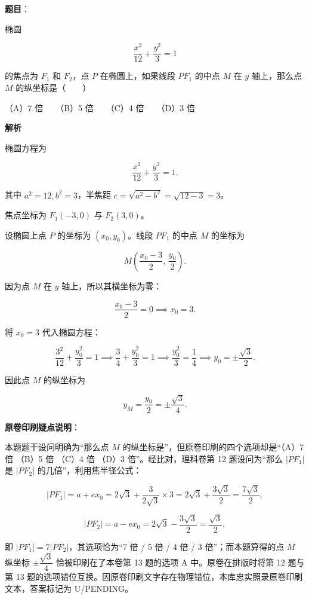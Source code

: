 \begin{answer}

\textbf{题目}：

椭圆

\nopagebreak[4]
\[
\frac{x^2}{12}+\frac{y^2}{3}=1
\]

的焦点为 $F_1$ 和 $F_2$，点 $P$ 在椭圆上，如果线段 $PF_1$ 的中点 $M$ 在 $y$ 轴上，那么点 $M$ 的纵坐标是\mbox{（　　）}

（A）7 倍　　（B）5 倍　　（C）4 倍　　（D）3 倍

\textbf{解析}

椭圆方程为

\nopagebreak[4]
\[
\frac{x^2}{12} + \frac{y^2}{3} = 1.
\]

其中 $a^2=12, b^2=3$，半焦距 $c = \sqrt{a^2-b^2} = \sqrt{12-3} = 3$。

焦点坐标为 $F_1(-3,0)$ 与 $F_2(3,0)$。

设椭圆上点 $P$ 的坐标为 $(x_0, y_0)$。线段 $PF_1$ 的中点 $M$ 的坐标为

\nopagebreak[4]
\[
M\left(\frac{x_0-3}{2},\, \frac{y_0}{2}\right).
\]

因为点 $M$ 在 $y$ 轴上，所以其横坐标为零：

\nopagebreak[4]
\[
\frac{x_0-3}{2} = 0 \implies x_0 = 3.
\]

将 $x_0=3$ 代入椭圆方程：

\nopagebreak[4]
\[
\frac{3^2}{12} + \frac{y_0^2}{3} = 1 \implies \frac34 + \frac{y_0^2}{3} = 1 \implies \frac{y_0^2}{3} = \frac14 \implies y_0 = \pm\frac{\sqrt3}{2}.
\]

因此点 $M$ 的纵坐标为

\nopagebreak[4]
\[
y_M = \frac{y_0}{2} = \pm\frac{\sqrt3}{4}.
\]

\textbf{原卷印刷疑点说明}：

本题题干设问明确为“那么点 $M$ 的纵坐标是”，但原卷印刷的四个选项却是“（A）7 倍 （B）5 倍 （C）4 倍 （D）3 倍”。经比对，理科卷第 12 题设问为“那么 $|PF_1|$ 是 $|PF_2|$ 的几倍”，利用焦半径公式：

\nopagebreak[4]
\[
|PF_1| = a + ex_0 = 2\sqrt3 + \frac{3}{2\sqrt3}\times 3 = 2\sqrt3 + \frac{3\sqrt3}{2} = \frac{7\sqrt3}{2},
\]

\nopagebreak[4]
\[
|PF_2| = a - ex_0 = 2\sqrt3 - \frac{3\sqrt3}{2} = \frac{\sqrt3}{2},
\]

即 $|PF_1| = 7|PF_2|$，其选项恰为“7 倍 / 5 倍 / 4 倍 / 3 倍”；而本题算得的点 $M$ 纵坐标 $\pm\dfrac{\sqrt3}{4}$ 恰被印刷在了本卷第 13 题的选项 A 中。原卷在排版时将第 12 题与第 13 题的选项错位互换。因原卷印刷文字存在物理错位，本库忠实照录原卷印刷文本，答案标记为 U/PENDING。


\end{answer}
